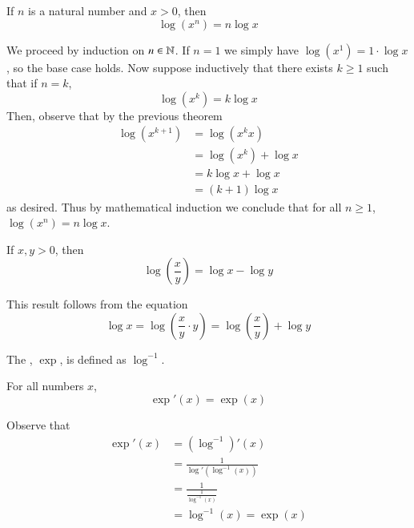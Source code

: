 \documentclass[12pt]{report}
\begin{document}
\begin{subappendices}
    \begin{cor}{}{}
        If $n$ is a natural number and $x > 0$, then \begin{equation}
            \log(x^n) = n\log x
        \end{equation}
    \end{cor}
    \begin{proof*}{}{}
        We proceed by induction on $n \in \mathbb N$. If $n = 1$ we simply have $\log(x^1) = 1\cdot \log x$, so the base case holds. Now suppose inductively that there exists $k \geq 1$ such that if $n = k$, \begin{equation*}
            \log(x^k) = k\log x
        \end{equation*}
        Then, observe that by the previous theorem \begin{align*}
            \log(x^{k+1}) &= \log(x^kx) \\
            &= \log(x^k) + \log x \\
            &= k\log x + \log x \tag{by the Induction Hypothesis} \\
            &= (k+1)\log x
        \end{align*}
        as desired. Thus by mathematical induction we conclude that for all $n \geq 1$, $\log(x^n) = n\log x$.
    \end{proof*}


    \begin{cor}{}{}
        If $x,y > 0$, then \begin{equation*}
            \log\left(\frac{x}{y}\right) = \log x - \log y
        \end{equation*}
    \end{cor}
    \begin{proof*}{}{}
        This result follows from the equation \begin{equation*}
            \log x = \log \left(\frac{x}{y}\cdot y\right) = \log\left(\frac{x}{y}\right) + \log y
        \end{equation*}
    \end{proof*}

    \begin{defn}{}{}
        The , $\exp$, is defined as $\log^{-1}$.
    \end{defn}

    \begin{thm}{}{}
        For all numbers $x$,\begin{equation*}
            \exp'(x) = \exp(x)
        \end{equation*}
    \end{thm}
    \begin{proof*}{}{}
        Observe that \begin{align*}
            \exp'(x) &= (\log^{-1})'(x) \\
            &= \frac{1}{\log'(\log^{-1}(x))} \\
            &= \frac{1}{\frac{1}{\log^{-1}(x)}} \\
            &= \log^{-1}(x) = \exp(x)
        \end{align*}
    \end{proof*}


\end{subappendices}
\end{document}
